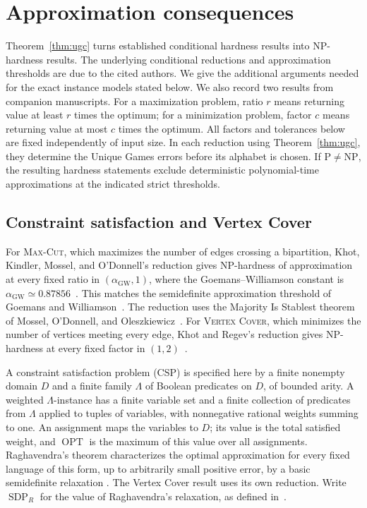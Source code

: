 \section{Approximation consequences}\label{sec:consequences}

Theorem~\ref{thm:ugc} turns established conditional hardness results
into NP-hardness results. The underlying conditional reductions and
approximation thresholds are due to the cited authors. We give the
additional arguments needed for the exact instance models stated below.
We also record two results from companion
manuscripts. For a maximization problem, ratio
\(r\) means returning value at least \(r\) times the optimum; for a
minimization problem, factor \(c\) means returning value at most \(c\)
times the optimum.
All factors and tolerances below are fixed independently of input size.
In each reduction using Theorem~\ref{thm:ugc}, they determine the
Unique Games errors before its alphabet is chosen. If
\(\mathrm P\ne\mathrm{NP}\), the resulting hardness statements exclude
deterministic polynomial-time approximations at the indicated strict
thresholds.

\subsection{Constraint satisfaction and Vertex Cover}

For \textsc{Max-Cut}, which maximizes the number of edges crossing a
bipartition, Khot, Kindler, Mossel, and O'Donnell's reduction gives
NP-hardness of approximation at every fixed ratio in
\((\alpha_{\mathrm{GW}},1)\), where the Goemans--Williamson constant is
\(\alpha_{\mathrm{GW}}\simeq0.87856\)~\cite[Theorem~1]{KKMO07}.
This matches the semidefinite approximation threshold of Goemans and
Williamson~\cite{GW95}. The reduction uses the Majority Is Stablest
theorem of Mossel, O'Donnell, and Oleszkiewicz~\cite{MOO10}.
For \textsc{Vertex Cover}, which minimizes the number of vertices
meeting every edge, Khot and Regev's reduction gives NP-hardness at
every fixed factor in \((1,2)\)~\cite{KhotRegev2008}.

A constraint satisfaction problem (CSP) is specified here by a finite
nonempty domain \(D\) and a finite family \(\Lambda\) of Boolean
predicates on \(D\), of bounded arity. A weighted \(\Lambda\)-instance
has a finite variable set and a finite collection of predicates from
\(\Lambda\) applied to tuples of variables, with nonnegative rational
weights summing to one. An assignment maps the variables to \(D\);
its value is the total satisfied weight, and \(\operatorname{OPT}\)
is the maximum of this value over all assignments.
Raghavendra's theorem characterizes the optimal approximation
for every fixed language of this form, up to arbitrarily small positive
error, by a basic semidefinite relaxation
\cite[Theorem~1.1 and Corollary~1.3]{Raghavendra08}.
The Vertex Cover result uses its own reduction. Write
\(\operatorname{SDP}_{R}\) for the value of Raghavendra's relaxation,
as defined in~\cite[Section~4.5]{RaghavendraThesis09}.

